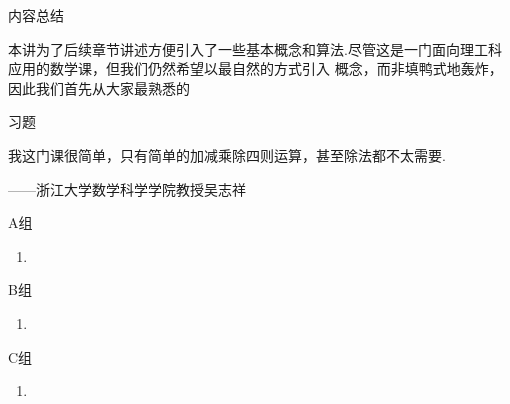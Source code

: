 \vspace{2ex} 
\centerline{\heiti \Large 内容总结}
\vspace{2ex} 

本讲为了后续章节讲述方便引入了一些基本概念和算法.尽管这是一门面向理工科应用的数学课，但我们仍然希望以最自然的方式引入
概念，而非填鸭式地轰炸，因此我们首先从大家最熟悉的

\centerline{\heiti \Large 习题}
\vspace{2ex} 
{\kaishu 我这门课很简单，只有简单的加减乘除四则运算，甚至除法都不太需要.}
\begin{flushright}
    \kaishu
	——浙江大学数学科学学院教授吴志祥
\end{flushright}
\centerline{\heiti A组}
\begin{enumerate}
	\item 
\end{enumerate}
\centerline{\heiti B组}
\begin{enumerate}
	\item 
\end{enumerate}
\centerline{\heiti C组}
\begin{enumerate}
	\item 
\end{enumerate}